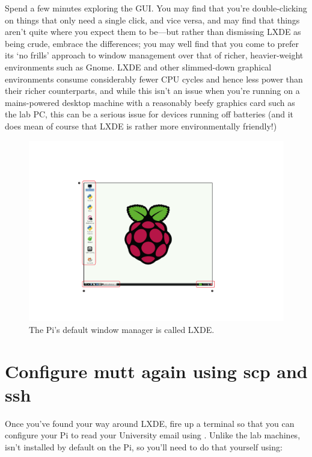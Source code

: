 Spend a few minutes exploring the GUI. You may find that you're double-clicking on things that only need a single click, and vice versa, and may find that things aren't quite where you expect them to be---but rather than dismissing LXDE as being crude, embrace the differences; you may well find that you come to prefer its `no frills' approach to window management over that of richer, heavier-weight environments such as Gnome. LXDE and other slimmed-down graphical environments consume considerably fewer CPU cycles and hence less power than their richer counterparts, and while this isn't an issue when you're running on a mains-powered desktop machine with a reasonably beefy graphics card such as the lab PC, this can be a serious issue for devices running off batteries (and it does mean of course that LXDE is rather more environmentally friendly!)

\begin{figure}
\centerline{\includegraphics[width=14cm]{images/lxde-desktop}}
\caption{The Pi's default window manager is called LXDE.}\label{figure:lxde-desktop}
\end{figure}

\section{Configure mutt again using scp and ssh}

Once you've found your way around LXDE, fire up a terminal so that you can configure your Pi to read your University email using . Unlike the lab machines,  isn't installed by default on the Pi, so you'll need to do that yourself using:

